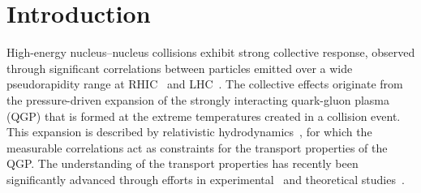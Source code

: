 
\section{Introduction}
\label{sec:intro}

High-energy nucleus--nucleus collisions exhibit strong collective response, observed through significant correlations between particles emitted over a wide pseudorapidity range at RHIC~\cite{Adams:2005dq,Adcox:2004mh,Arsene:2004fa,Back:2004je} and LHC~\cite{Abelev:2012di, Abelev:2014pua, ATLAS:2011ah}. The collective effects originate from the pressure-driven expansion of the strongly interacting quark-gluon plasma (QGP) that is formed at the extreme temperatures created in a collision event. This expansion is described by relativistic hydrodynamics~\cite{Romatschke:2007mq,Jeon:2015dfa,Romatschke:2017ejr}, for which the measurable correlations act as constraints for the transport properties of the QGP. The understanding of the transport properties has recently been significantly advanced through efforts in experimental~\cite{ALICE:2016kpq,Acharya:2017gsw,Acharya:2017zfg,Acharya:2020taj} and theoretical studies~\cite{Niemi:2015qia,Bernhard:2016tnd,Bernhard:2019bmu,Parkkila:2021tqq,Parkkila:2021yha}.


